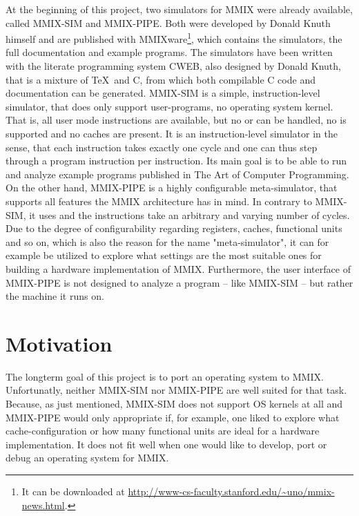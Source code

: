 At the beginning of this project, two simulators for MMIX were already available, called MMIX-SIM and MMIX-PIPE. Both were developed by \gls{Donald Knuth} himself and are published with MMIXware\footnote{It can be downloaded at \url{http://www-cs-faculty.stanford.edu/~uno/mmix-news.html}.}, which contains the simulators, the full documentation and example programs. The simulators have been written with the literate programming system CWEB, also designed by \gls{Donald Knuth}, that is a mixture of \gls{TeX}~and C, from which both compilable C code and documentation can be generated. MMIX-SIM is a simple, instruction-level simulator, that does only support user-programs, \ie no operating system kernel. That is, all user mode instructions are available, but no  or  can be handled, no  is supported and no caches are present. It is an instruction-level simulator in the sense, that each instruction takes exactly one cycle and one can thus step through a program instruction per instruction. Its main goal is to be able to run and analyze example programs published in \gls{The Art of Computer Programming}. \citep[pg. 1]{mmix-sim} On the other hand, MMIX-PIPE is a highly configurable meta-simulator, that supports all features the MMIX architecture has in mind. In contrary to MMIX-SIM, it uses  and the instructions take an arbitrary and varying number of cycles. Due to the degree of configurability regarding registers, caches, functional units and so on, which is also the reason for the name "meta-simulator", it can for example be utilized to explore what settings are the most suitable ones for building a hardware implementation of MMIX. Furthermore, the user interface of MMIX-PIPE is not designed to analyze a program -- like MMIX-SIM -- but rather the machine it runs on.

\section{Motivation}

The longterm goal of this project is to port an operating system to MMIX. Unfortunatly, neither MMIX-SIM nor MMIX-PIPE are well suited for that task. Because, as just mentioned, MMIX-SIM does not support OS kernels at all and MMIX-PIPE would only appropriate if, for example, one liked to explore what cache-configuration or how many functional units are ideal for a hardware implementation. It does not fit well when one would like to develop, port or debug an operating system for MMIX.

